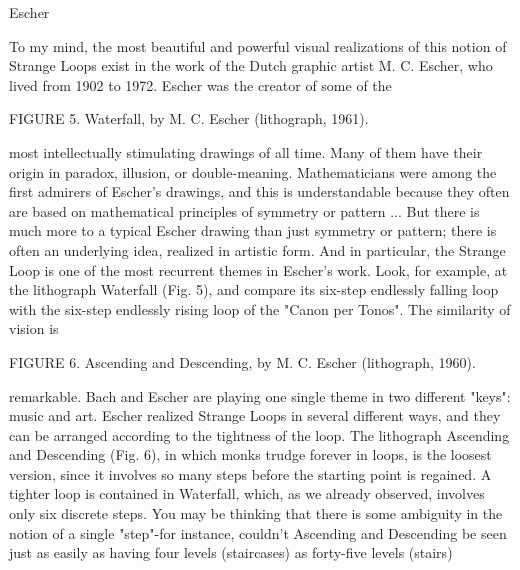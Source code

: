 Escher 

To my mind, the most beautiful and powerful visual realizations of this notion of Strange Loops exist in the work of the Dutch graphic artist M. C. Escher, who lived from 1902 to 1972. Escher was the creator of some of the 







FIGURE 5. Waterfall, by M. C. Escher (lithograph, 1961). 

most intellectually stimulating drawings of all time. Many of them have their origin in paradox, illusion, or double-meaning. Mathematicians were among the first admirers of Escher's drawings, and this is understandable because they often are based on mathematical principles of symmetry or pattern ... But there is much more to a typical Escher drawing than just symmetry or pattern; there is often an underlying idea, realized in artistic form. And in particular, the Strange Loop is one of the most recurrent themes in Escher's work. Look, for example, at the lithograph Waterfall (Fig. 5), and compare its six-step endlessly falling loop with the six-step endlessly rising loop of the "Canon per Tonos". The similarity of vision is 







FIGURE 6. Ascending and Descending, by M. C. Escher (lithograph, 1960). 







remarkable. Bach and Escher are playing one single theme in two different "keys": music and art. Escher realized Strange Loops in several different ways, and they can be arranged according to the tightness of the loop. The lithograph Ascending and Descending (Fig. 6), in which monks trudge forever in loops, is the loosest version, since it involves so many steps before the starting point is regained. A tighter loop is contained in Waterfall, which, as we already observed, involves only six discrete steps. You may be thinking that there is some ambiguity in the notion of a single "step"-for instance, couldn't Ascending and Descending be seen just as easily as having four levels (staircases) as forty-five levels (stairs)%







